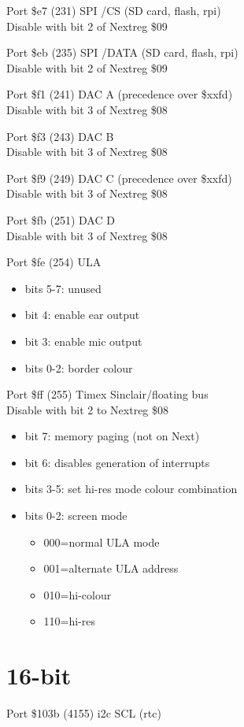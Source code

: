 Port \$e7 (231) SPI /CS (SD card, flash, rpi)\\
Disable with bit 2 of Nextreg \$09

Port \$eb (235) SPI /DATA (SD card, flash, rpi)\\
Disable with bit 2 of Nextreg \$09

Port \$f1 (241) DAC A (precedence over \$xxfd)\\
Disable with bit 3 of Nextreg \$08

Port \$f3 (243) DAC B\\
Disable with bit 3 of Nextreg \$08

Port \$f9 (249) DAC C (precedence over \$xxfd)\\
Disable with bit 3 of Nextreg \$08

Port \$fb (251) DAC D\\
Disable with bit 3 of Nextreg \$08

Port \$fe (254) ULA
\begin{itemize}
  \item[] bits 5-7: unused
  \item[] bit 4: enable ear output
  \item[] bit 3: enable mic output
  \item[] bits 0-2: border colour
\end{itemize}

Port \$ff (255) Timex Sinclair/floating bus\\
Disable with bit 2 to Nextreg \$08
\begin{itemize}
\item[] bit 7: memory paging (not on Next)
\item[] bit 6: disables generation of interrupts
\item[] bits 3-5: set hi-res mode colour combination
\item[] bits 0-2: screen mode
  \begin{itemize}
  \item[] 000=normal ULA mode
  \item[] 001=alternate ULA address
  \item[] 010=hi-colour
  \item[] 110=hi-res
  \end{itemize}
\end{itemize}

\section{16-bit}
Port \$103b (4155) i2c SCL (rtc)

